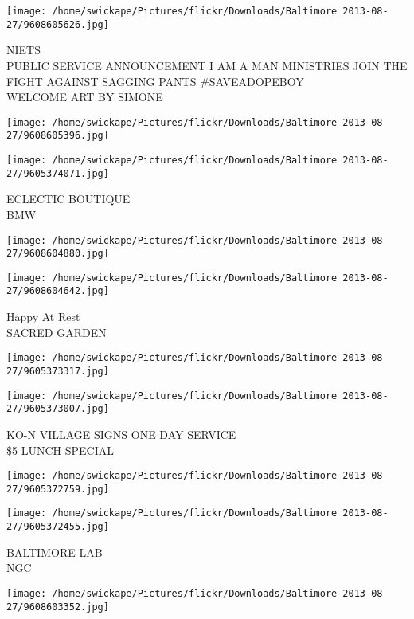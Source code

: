 \documentclass[10pt,letterpaper]{article}
\begin{document}
\texttt{[image: /home/swickape/Pictures/flickr/Downloads/Baltimore 2013-08-27/9608605626.jpg]}

NIETS\\
PUBLIC SERVICE ANNOUNCEMENT I AM A MAN MINISTRIES JOIN THE FIGHT AGAINST SAGGING PANTS \#SAVEADOPEBOY\\
WELCOME ART BY SIMONE\\
\pagebreak

\texttt{[image: /home/swickape/Pictures/flickr/Downloads/Baltimore 2013-08-27/9608605396.jpg]}

\vspace{0.25in}
\texttt{[image: /home/swickape/Pictures/flickr/Downloads/Baltimore 2013-08-27/9605374071.jpg]}

ECLECTIC BOUTIQUE\\
BMW\\
\pagebreak

\texttt{[image: /home/swickape/Pictures/flickr/Downloads/Baltimore 2013-08-27/9608604880.jpg]}

\vspace{0.25in}
\texttt{[image: /home/swickape/Pictures/flickr/Downloads/Baltimore 2013-08-27/9608604642.jpg]}

Happy At Rest\\
SACRED GARDEN\\
\pagebreak

\texttt{[image: /home/swickape/Pictures/flickr/Downloads/Baltimore 2013-08-27/9605373317.jpg]}

\vspace{0.25in}
\texttt{[image: /home/swickape/Pictures/flickr/Downloads/Baltimore 2013-08-27/9605373007.jpg]}

KO{-}N VILLAGE SIGNS ONE DAY SERVICE\\
\$5 LUNCH SPECIAL\\
\pagebreak

\texttt{[image: /home/swickape/Pictures/flickr/Downloads/Baltimore 2013-08-27/9605372759.jpg]}

\vspace{0.25in}
\texttt{[image: /home/swickape/Pictures/flickr/Downloads/Baltimore 2013-08-27/9605372455.jpg]}

BALTIMORE LAB\\
NGC\\
\pagebreak

\texttt{[image: /home/swickape/Pictures/flickr/Downloads/Baltimore 2013-08-27/9608603352.jpg]}
\end{document}
